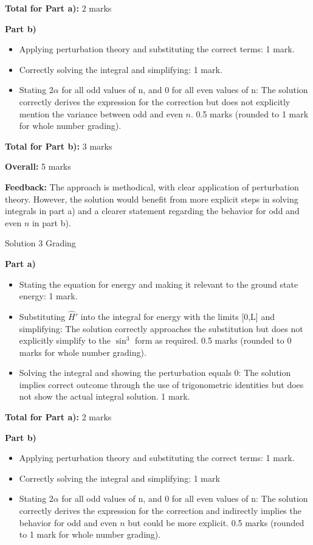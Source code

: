 \documentclass[a4paper,11pt]{article}
\begin{document}
\textbf{Total for Part a):} 2 marks

\textbf{Part b)}
\begin{itemize}
    \item Applying perturbation theory and substituting the correct terms: 1 mark.
    \item Correctly solving the integral and simplifying: 1 mark.
    \item Stating \(2 \alpha \) for all odd values of n, and 0 for all even values of n: The solution correctly derives the expression for the correction but does not explicitly mention the variance between odd and even \(n\). 0.5 marks (rounded to 1 mark for whole number grading).
\end{itemize}

\textbf{Total for Part b):} 3 marks

\textbf{Overall:} 5 marks

\textbf{Feedback:} The approach is methodical, with clear application of perturbation theory. However, the solution would benefit from more explicit steps in solving integrals in part a) and a clearer statement regarding the behavior for odd and even \(n\) in part b).

Solution 3 Grading

\textbf{Part a)}
\begin{itemize}
    \item Stating the equation for energy and making it relevant to the ground state energy: 1 mark.
    \item Substituting \( \hat{H}' \) into the integral for energy with the limits [0,L] and simplifying: The solution correctly approaches the substitution but does not explicitly simplify to the \(\sin^3\) form as required. 0.5 marks (rounded to 0 marks for whole number grading).
    \item Solving the integral and showing the perturbation equals 0: The solution implies correct outcome through the use of trigonometric identities but does not show the actual integral solution. 1 mark.
\end{itemize}

\textbf{Total for Part a):} 2 marks

\textbf{Part b)}
\begin{itemize}
    \item Applying perturbation theory and substituting the correct terms: 1 mark.
    \item Correctly solving the integral and simplifying: 1 mark
    \item Stating \(2\alpha\) for all odd values of n, and 0 for all even values of n: The solution correctly derives the expression for the correction and indirectly implies the behavior for odd and even \(n\)
    but could be more explicit. 0.5 marks (rounded to 1 mark for whole number grading).
\end{itemize}
\end{document}
